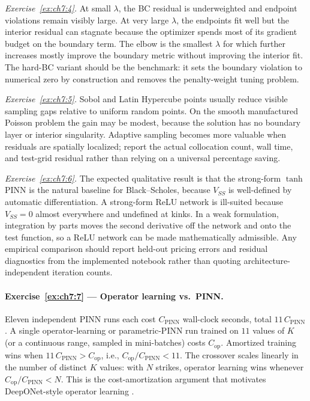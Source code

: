 \documentclass[11pt,a4paper]{report}
\begin{document}
\emph{Exercise~\ref{ex:ch7:4}.}  At small $\lambda$, the BC residual is underweighted and endpoint violations remain visibly large.  At very large $\lambda$, the endpoints fit well but the interior residual can stagnate because the optimizer spends most of its gradient budget on the boundary term.  The elbow is the smallest $\lambda$ for which further increases mostly improve the boundary metric without improving the interior fit.  The hard-BC variant should be the benchmark: it sets the boundary violation to numerical zero by construction and removes the penalty-weight tuning problem.

\emph{Exercise~\ref{ex:ch7:5}.}  Sobol and Latin Hypercube points usually reduce visible sampling gaps relative to uniform random points.  On the smooth manufactured Poisson problem the gain may be modest, because the solution has no boundary layer or interior singularity.  Adaptive sampling becomes more valuable when residuals are spatially localized; report the actual collocation count, wall time, and test-grid residual rather than relying on a universal percentage saving.

\emph{Exercise~\ref{ex:ch7:6}.}  The expected qualitative result is that the strong-form $\tanh$ PINN is the natural baseline for Black--Scholes, because $V_{SS}$ is well-defined by automatic differentiation.  A strong-form ReLU network is ill-suited because $V_{SS}=0$ almost everywhere and undefined at kinks.  In a weak formulation, integration by parts moves the second derivative off the network and onto the test function, so a ReLU network can be made mathematically admissible.  Any empirical comparison should report held-out pricing errors and residual diagnostics from the implemented notebook rather than quoting architecture-independent iteration counts.

\paragraph{Exercise~\ref{ex:ch7:7} --- Operator learning vs.\ PINN.}
Eleven independent PINN runs each cost $C_\mathrm{PINN}$ wall-clock seconds, total $11\,C_\mathrm{PINN}$.  A single operator-learning or parametric-PINN run trained on $11$ values of $K$ (or a continuous range, sampled in mini-batches) costs $C_\mathrm{op}$.  Amortized training wins when $11\,C_\mathrm{PINN} > C_\mathrm{op}$, i.e., $C_\mathrm{op}/C_\mathrm{PINN} < 11$.  The crossover scales linearly in the number of distinct $K$ values: with $N$ strikes, operator learning wins whenever $C_\mathrm{op}/C_\mathrm{PINN}<N$.  This is the cost-amortization argument that motivates DeepONet-style operator learning \citep{lu2021learning}.
\end{document}
